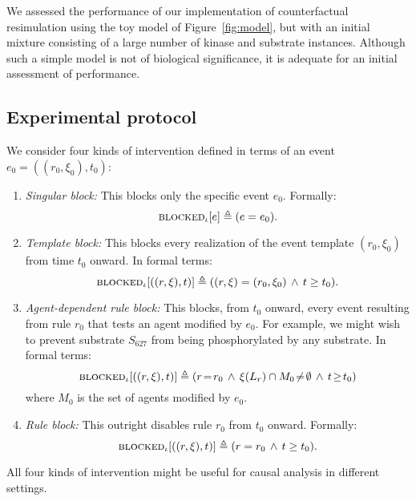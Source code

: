 
\newcommand{\subs}[2]{#1_{\textsf{#2}}}

We assessed the performance of our implementation of counterfactual
resimulation using the toy model of Figure~\ref{fig:model}, but with an initial
mixture consisting of a large number of kinase and substrate instances. Although
such a simple model is not of biological significance, it is adequate for an
initial assessment of performance.

\subsection{Experimental protocol}

We consider four kinds of intervention defined in terms of an event
$e_0=((r_0, \xi_0), t_0)$:
\begin{enumerate}[leftmargin=0.4cm]
\item \textit{Singular block:} This blocks only the specific event $e_0$. Formally: 
\[{\textsc{blocked}}_{\iota}[e] \triangleq (e = e_0).\]
\item \textit{Template block:} This blocks every realization of the event template $(r_0, \xi_0)$ from time $t_0$ onward. In formal terms:
\[{\textsc{blocked}}_{\iota}[((r, \xi), t)] \triangleq ((r, \xi) = (r_0, \xi_0)
\,\wedge\, t \geq t_0).\]
\item \textit{Agent-dependent rule block:} This blocks, from
$t_0$ onward, every event resulting from rule $r_0$ that tests an agent
modified by $e_0$. For example, we might wish to prevent substrate $S_{627}$ from being phosphorylated by any substrate. In formal terms: \[{\textsc{blocked}}_{\iota}[((r, \xi), t)] \triangleq (r \!=\! r_0 \,\wedge\, \xi(L_r)\cap M_0 \!\neq\! \emptyset \,\wedge\, t \!\geq\! t_0)\] where $M_0$ is the set of agents modified by $e_0$.
\item \textit{Rule block:} This outright disables rule
$r_0$ from $t_0$ onward. Formally: \[{\textsc{blocked}}_{\iota}[((r, \xi), t)] \triangleq (r = r_0 \,\wedge\, t \geq t_0).\]
\end{enumerate}
All four kinds of intervention might be useful for causal analysis in
different settings.

